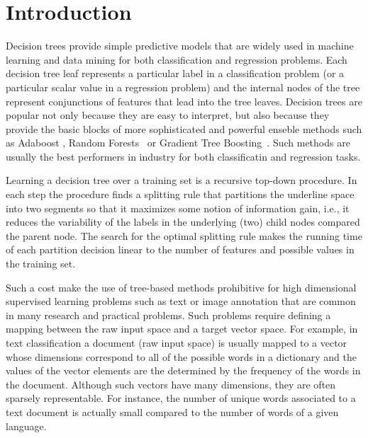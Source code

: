 \section{Introduction}


Decision trees provide simple predictive models that are widely used
in machine learning and data mining for both classification and
regression problems. Each decision tree leaf represents a particular
label in a classification problem (or a particular scalar value in a
regression problem) and the internal nodes of the tree represent
conjunctions of features that lead into the tree leaves. Decision
trees are popular not only because they are easy to interpret, but
also because they provide the basic blocks of more sophisticated and
powerful enseble methods such as Adaboost \cite{freund1995desicion},
Random Forests~\cite{breiman2001random} or Gradient Tree
Boosting~\cite{friedman2001greedy}. Such methods are usually the best
performers in industry for both classificatin and regression tasks.

Learning a decision tree over a training set is a recursive top-down
procedure. In each step the procedure finds a splitting rule that
partitions the underline space into two segments so that it maximizes
some notion of information gain, i.e., it reduces the variability of
the labels in the underlying (two) child nodes compared the parent
node. The search for the optimal splitting rule makes the running time
of each partition decision linear to the number of features and
possible values in the training set.

Such a cost make the use of tree-based methods prohibitive for high
dimensional supervised learning problems such as text or image
annotation that are common in many research and practical
problems. Such problems require defining a mapping between the raw
input space and a target vector space. For example, in text
classification a document (raw input space) is usually mapped to a
vector whose dimensions correspond to all of the possible words in a
dictionary and the values of the vector elements are the determined by
the frequency of the words in the document.  Although such vectors
have many dimensions, they are often sparsely representable. For
instance, the number of unique words associated to a text document is
actually small compared to the number of words of a given language.

